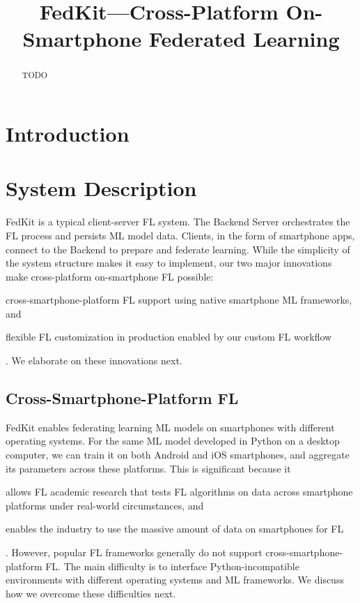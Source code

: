 \documentclass[letterpaper]{article} %
\title{FedKit---Cross-Platform On-Smartphone Federated Learning}
\author{}
\begin{document}
\maketitle

\begin{abstract}
    TODO
\end{abstract}

\section{Introduction}


\section{System Description}

FedKit is a typical client-server FL system.
The Backend Server orchestrates the FL process and persists ML model data.
Clients, in the form of smartphone apps,
connect to the Backend to prepare and federate learning.
While the simplicity of the system structure makes it easy to implement,
our two major innovations make cross-platform on-smartphone FL possible:
\begin{enumerate*}[label=\arabic*)]
    \item cross-smartphone-platform FL support using
        native smartphone ML frameworks, and
    \item flexible FL customization in production enabled by
        our custom FL workflow
\end{enumerate*}.
We elaborate on these innovations next.

\subsection{Cross-Smartphone-Platform FL}
FedKit enables federating learning ML models on smartphones
with different operating systems.
For the same ML model developed in Python on a desktop computer,
we can train it on both Android and iOS smartphones,
and aggregate its parameters across these platforms.
This is significant because it
\begin{enumerate*}[label=\arabic*)]
    \item allows FL academic research that tests FL algorithms
        on data across smartphone platforms under real-world circumstances, and
    \item enables the industry to use the massive amount of data on smartphones
        for FL
\end{enumerate*}.
However, popular FL frameworks generally do not support
cross-smartphone-platform FL.
The main difficulty is to interface
Python-incompatible environments with different operating systems and
ML frameworks.
We discuss how we overcome these difficulties next.
\end{document}
